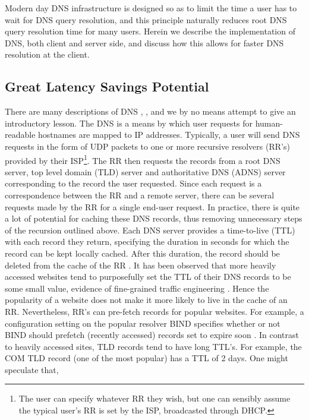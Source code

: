 \documentclass[sigconf,nonacm,10pt]{acmart}
\begin{document}
Modern day DNS infrastructure is designed so as to limit the time a user
has to wait for DNS query resolution, and this principle naturally
reduces root DNS query resolution time for many users. Herein we
describe the implementation of DNS, both client and server side, and
discuss how this allows for faster DNS resolution at the client.

\subsection{Great Latency Savings
Potential}\label{great-latency-savings-potential-1}

There are many descriptions of DNS \cite{kurose2010computer},
\cite{cloudflare_dns_tutorial}, and we by no means attempt to give an
introductory lesson. The DNS is a means by which user requests for
human-readable hostnames are mapped to IP addresses. Typically, a user
will send DNS requests in the form of UDP packets to one or more
recursive resolvers (RR's) provided by their
ISP\footnote{ The user can specify whatever RR they wish, but one can sensibly assume the typical user's RR is set by the ISP, broadcasted through DHCP. }.
The RR then requests the records from a root DNS server, top level
domain (TLD) server and authoritative DNS (ADNS) server corresponding to
the record the user requested. Since each request is a correspondence
between the RR and a remote server, there can be several requests made
by the RR for a single end-user request. \break \break
In practice, there is quite a lot of potential for caching these DNS
records, thus removing unnecessary steps of the recursion outlined
above. Each DNS server provides a time-to-live (TTL) with each record
they return, specifying the duration in seconds for which the record can
be kept locally cached. After this duration, the record should be
deleted from the cache of the RR \cite{rfc_1035}. It has been observed
that more heavily accessed websites tend to purposefully set the TTL of
their DNS records to be some small value, evidence of fine-grained
traffic engineering \cite{callahan2013modern}. Hence the popularity of a
website does not make it more likely to live in the cache of an RR.
Nevertheless, RR's can pre-fetch records for popular websites. For
example, a configuration setting on the popular resolver BIND specifies
whether or not BIND should prefetch (recently accessed) records set to
expire soon \cite{bind9_config}. In contrast to heavily accessed sites,
TLD records tend to have long TTL's. For example, the COM TLD record
(one of the most popular) has a TTL of 2 days. One might speculate that,
\end{document}
